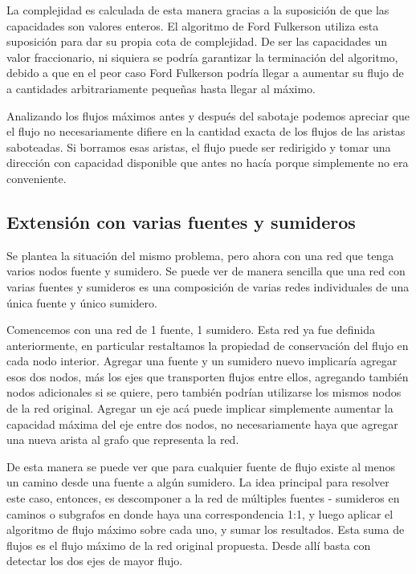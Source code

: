 \documentclass{article}
\begin{document}
La complejidad es calculada de esta manera gracias a la suposición de que las capacidades son valores enteros. El algoritmo de Ford Fulkerson utiliza esta suposición para dar su propia cota de complejidad. De ser las capacidades un valor fraccionario, ni siquiera se podría garantizar la terminación del algoritmo, debido a que en el peor caso Ford Fulkerson podría llegar a aumentar su flujo de a cantidades arbitrariamente pequeñas hasta llegar al máximo.

Analizando los flujos máximos antes y después del sabotaje podemos apreciar que el flujo no necesariamente difiere en la cantidad exacta de los flujos de las aristas saboteadas. Si borramos esas aristas, el flujo puede ser redirigido y tomar una dirección con capacidad disponible que antes no hacía porque simplemente no era conveniente.

\subsection{Extensión con varias fuentes y sumideros}

Se plantea la situación del mismo problema, pero ahora con una red que tenga varios nodos fuente y sumidero. Se puede ver de manera sencilla que una red con varias fuentes y sumideros es una composición de varias redes individuales de una única fuente y único sumidero.

Comencemos con una red de 1 fuente, 1 sumidero. Esta red ya fue definida anteriormente, en particular restaltamos la propiedad de conservación del flujo en cada nodo interior. Agregar una fuente y un sumidero nuevo implicaría agregar esos dos nodos, más los ejes que transporten flujos entre ellos, agregando también nodos adicionales si se quiere, pero también podrían utilizarse los mismos nodos de la red original. Agregar un eje acá puede implicar simplemente aumentar la capacidad máxima del eje entre dos nodos, no necesariamente haya que agregar una nueva arista al grafo que representa la red.

De esta manera se puede ver que para cualquier fuente de flujo existe al menos un camino desde una fuente a algún sumidero. La idea principal para resolver este caso, entonces, es descomponer a la red de múltiples fuentes - sumideros en caminos o subgrafos en donde haya una correspondencia 1:1, y luego aplicar el algoritmo de flujo máximo sobre cada uno, y sumar los resultados. Esta suma de flujos es el flujo máximo de la red original propuesta. Desde allí basta con detectar los dos ejes de mayor flujo.
\end{document}
